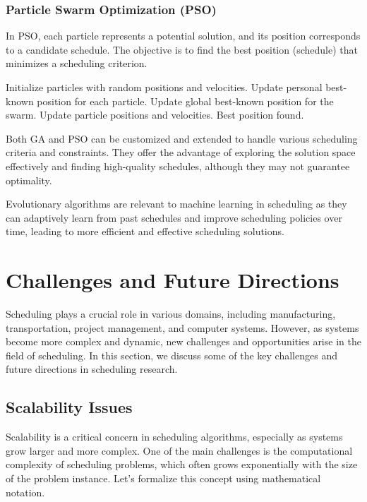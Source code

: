 \documentclass[12pt]{book} %
\begin{document}
\subsubsection{Particle Swarm Optimization (PSO)}

In PSO, each particle represents a potential solution, and its position corresponds to a candidate schedule. The objective is to find the best position (schedule) that minimizes a scheduling criterion.
\FloatBarrier
\begin{algorithm}
\caption{Particle Swarm Optimization for Job Scheduling}
\begin{algorithmic}[1]
\State Initialize particles with random positions and velocities.
    \State Update personal best-known position for each particle.
    \State Update global best-known position for the swarm.
    \State Update particle positions and velocities.
\EndFor
\Return Best position found.
\end{algorithmic}
\end{algorithm}
\FloatBarrier
Both GA and PSO can be customized and extended to handle various scheduling criteria and constraints. They offer the advantage of exploring the solution space effectively and finding high-quality schedules, although they may not guarantee optimality.

Evolutionary algorithms are relevant to machine learning in scheduling as they can adaptively learn from past schedules and improve scheduling policies over time, leading to more efficient and effective scheduling solutions.


\section{Challenges and Future Directions}

Scheduling plays a crucial role in various domains, including manufacturing, transportation, project management, and computer systems. However, as systems become more complex and dynamic, new challenges and opportunities arise in the field of scheduling. In this section, we discuss some of the key challenges and future directions in scheduling research.

\subsection{Scalability Issues}

Scalability is a critical concern in scheduling algorithms, especially as systems grow larger and more complex. One of the main challenges is the computational complexity of scheduling problems, which often grows exponentially with the size of the problem instance. Let's formalize this concept using mathematical notation.
\end{document}
